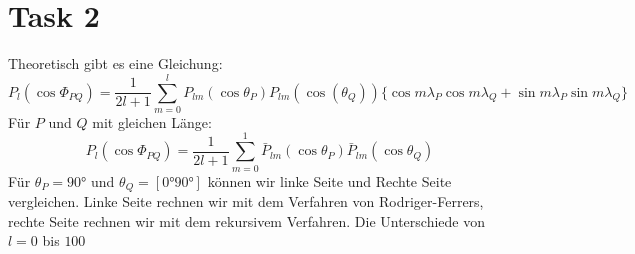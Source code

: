 \documentclass[12pt]{article}
\begin{document}
\section{Task 2}
Theoretisch gibt es eine Gleichung:
\begin{equation*}
P_l(\cos \Phi_{PQ}) = \frac{1}{2l+1} \sum_{m=0}^{l} P_{lm}(\cos \theta_P) P_{lm}(\cos(\theta_Q))\{\cos m \lambda_P \cos m \lambda_Q + \sin m \lambda_P \sin m \lambda_Q\}
\end{equation*}
Für $P$ und $Q$ mit gleichen Länge:
\begin{equation*}
P_l(\cos \Phi_{PQ}) = \frac{1}{2l+1} \sum_{m=0}^{1} \bar{P}_{lm}(\cos \theta_P) \bar{P}_{lm}(\cos \theta_Q)
\end{equation*}
Für $\theta_P = 90°$ und $\theta_Q = [0° 90°]$ können wir linke Seite und Rechte Seite vergleichen. Linke Seite rechnen wir mit dem Verfahren von Rodriger-Ferrers, rechte Seite rechnen wir mit dem rekursivem Verfahren. Die Unterschiede von $l = 0 $ bis $100$ \newline
\begin{figure}[ht]\centering
\end{figure}
\end{document}
